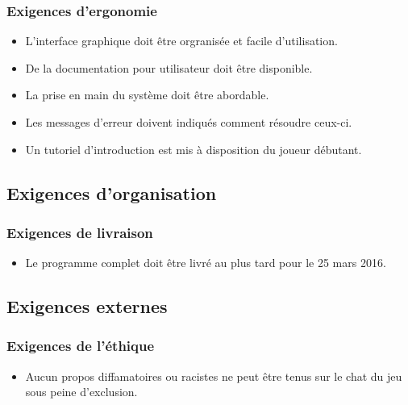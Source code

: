     \subsubsection{Exigences d'ergonomie}
        \begin{itemize}
        \renewcommand\labelitemi{\textbullet}
        \item L'interface graphique doit être orgranisée et facile d'utilisation.
        \item De la documentation pour utilisateur doit être disponible.
        \item La prise en main du système doit être abordable.
        \item Les messages d'erreur doivent indiqués comment résoudre ceux-ci.
        \item Un tutoriel d'introduction est mis à disposition du joueur débutant.
        \end{itemize}
        
    \subsection{Exigences d'organisation}
    \subsubsection{Exigences de livraison}
    \begin{itemize}
        \renewcommand\labelitemi{\textbullet}
        \item Le programme complet doit être livré au plus tard pour le 25 mars 2016.
    \end{itemize}

\iffalse
    \subsection{Organisational Requirements}
        \subsubsection{Implementation requirements}
        \subsubsection{Standards Requirements}
        \subsubsection{Delivery Requirements}
\fi
    \subsection{Exigences externes}
    \subsubsection{Exigences de l'éthique}
    \begin{itemize}
        \renewcommand\labelitemi{\textbullet}
        \item Aucun propos diffamatoires ou racistes ne peut être tenus sur le chat du jeu sous peine d'exclusion.
    \end{itemize}